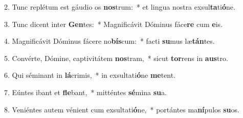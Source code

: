 2. Tunc replétum est gáudio os \textbf{nos}trum:~*  et lingua nostra exsul\textbf{ta}ti\textbf{ó}ne.\

3. Tunc dicent inter \textbf{Gen}tes:~*  Magnificávit Dóminus fáce\textbf{re} cum \textbf{e}is.\

4. Magnificávit Dóminus fácere no\textbf{bís}cum:~*  facti \textbf{su}mus læ\textbf{tán}tes.\

5. Convérte, Dómine, captivitátem \textbf{nos}tram,~*  sicut \textbf{tor}rens in \textbf{aus}tro.\

6. Qui séminant in \textbf{lá}crimis,~*  in exsultati\textbf{ó}ne \textbf{me}tent.\

7. Eúntes ibant et \textbf{fle}bant,~*  mitténtes \textbf{sé}mina \textbf{su}a.\

8. Veniéntes autem vénient cum exsultati\textbf{ó}ne,~*  portántes ma\textbf{ní}pulos \textbf{su}os.\

